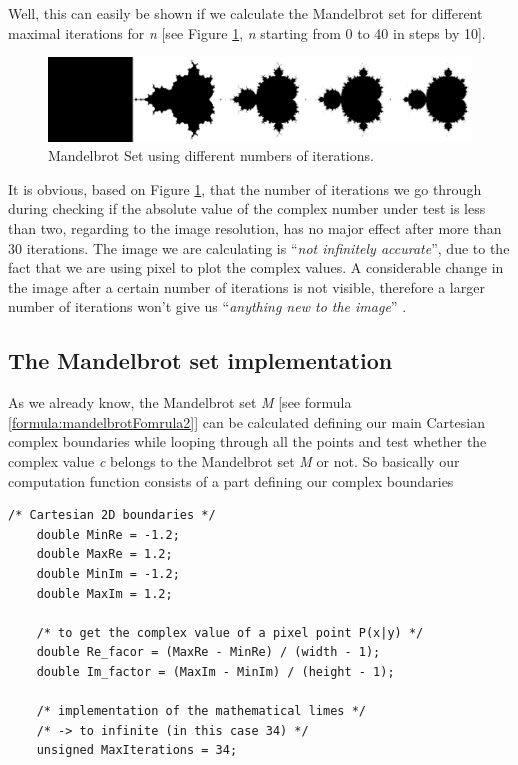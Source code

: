 Well, this can easily be shown if we calculate the Mandelbrot set for different maximal iterations for \textit{n} [see Figure \ref{fig:mandelbrotItertions}, \textit{n} starting from 0 to 40 in steps by 10].

\begin{figure}[htbp]
	\centerline{\includegraphics[width=0.9\linewidth]{images/mandelbrot-iterations.png}}
	\caption{ Mandelbrot Set using different numbers of iterations.}
	\label{fig:mandelbrotItertions}
\end{figure}  

It is obvious, based on Figure \ref{fig:mandelbrotItertions}, that the number of iterations we go through during checking if the absolute value of the complex number under test is less than two, regarding to the image resolution, has no major effect after more than 30 iterations. The image we are calculating is ``\textit{not infinitely accurate}'', due to the fact that we are using pixel to plot the complex values. A considerable change in the image after a certain number of iterations \parencite{internet15} is not visible, therefore a larger number of iterations won't give us ``\textit{anything new to the image}'' \parencite{internet15}. 

\newpage

\subsection{The Mandelbrot set implementation} \label{subsection:mandelbrotCalc}

As we already know, the Mandelbrot set \textit{M} [see formula \ref{formula:mandelbrotFomrula2}] can be calculated defining our main Cartesian complex boundaries while looping through all the points and test whether the complex value \textit{c} belongs to the Mandelbrot set \textit{M} or not. So basically our computation function consists of a part defining our complex boundaries 

\begin{lstlisting}[label={code:mandelbrotBoundaries}]
	/* Cartesian 2D boundaries */
	double MinRe = -1.2;
	double MaxRe = 1.2;
	double MinIm = -1.2;
	double MaxIm = 1.2;
	
	/* to get the complex value of a pixel point P(x|y) */
	double Re_facor = (MaxRe - MinRe) / (width - 1);
	double Im_factor = (MaxIm - MinIm) / (height - 1);
	
	/* implementation of the mathematical limes */
	/* -> to infinite (in this case 34) */
	unsigned MaxIterations = 34;
\end{lstlisting}  

